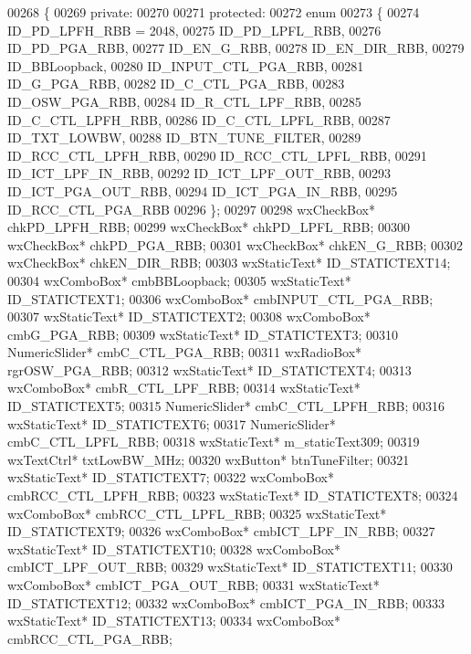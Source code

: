 \begin{DoxyCode}
00268 \{
00269     \textcolor{keyword}{private}:
00270     
00271     \textcolor{keyword}{protected}:
00272         \textcolor{keyword}{enum}
00273         \{
00274             ID\_PD\_LPFH\_RBB = 2048,
00275             ID_PD_LPFL_RBB,
00276             ID_PD_PGA_RBB,
00277             ID_EN_G_RBB,
00278             ID_EN_DIR_RBB,
00279             ID_BBLoopback,
00280             ID_INPUT_CTL_PGA_RBB,
00281             ID_G_PGA_RBB,
00282             ID_C_CTL_PGA_RBB,
00283             ID_OSW_PGA_RBB,
00284             ID_R_CTL_LPF_RBB,
00285             ID_C_CTL_LPFH_RBB,
00286             ID_C_CTL_LPFL_RBB,
00287             ID_TXT_LOWBW,
00288             ID_BTN_TUNE_FILTER,
00289             ID_RCC_CTL_LPFH_RBB,
00290             ID_RCC_CTL_LPFL_RBB,
00291             ID_ICT_LPF_IN_RBB,
00292             ID_ICT_LPF_OUT_RBB,
00293             ID_ICT_PGA_OUT_RBB,
00294             ID_ICT_PGA_IN_RBB,
00295             ID\_RCC\_CTL\_PGA\_RBB
00296         \};
00297         
00298         wxCheckBox* chkPD_LPFH_RBB;
00299         wxCheckBox* chkPD_LPFL_RBB;
00300         wxCheckBox* chkPD_PGA_RBB;
00301         wxCheckBox* chkEN_G_RBB;
00302         wxCheckBox* chkEN_DIR_RBB;
00303         wxStaticText* ID_STATICTEXT14;
00304         wxComboBox* cmbBBLoopback;
00305         wxStaticText* ID_STATICTEXT1;
00306         wxComboBox* cmbINPUT_CTL_PGA_RBB;
00307         wxStaticText* ID_STATICTEXT2;
00308         wxComboBox* cmbG_PGA_RBB;
00309         wxStaticText* ID_STATICTEXT3;
00310         NumericSlider* cmbC_CTL_PGA_RBB;
00311         wxRadioBox* rgrOSW_PGA_RBB;
00312         wxStaticText* ID_STATICTEXT4;
00313         wxComboBox* cmbR_CTL_LPF_RBB;
00314         wxStaticText* ID_STATICTEXT5;
00315         NumericSlider* cmbC_CTL_LPFH_RBB;
00316         wxStaticText* ID_STATICTEXT6;
00317         NumericSlider* cmbC_CTL_LPFL_RBB;
00318         wxStaticText* m_staticText309;
00319         wxTextCtrl* txtLowBW_MHz;
00320         wxButton* btnTuneFilter;
00321         wxStaticText* ID_STATICTEXT7;
00322         wxComboBox* cmbRCC_CTL_LPFH_RBB;
00323         wxStaticText* ID_STATICTEXT8;
00324         wxComboBox* cmbRCC_CTL_LPFL_RBB;
00325         wxStaticText* ID_STATICTEXT9;
00326         wxComboBox* cmbICT_LPF_IN_RBB;
00327         wxStaticText* ID_STATICTEXT10;
00328         wxComboBox* cmbICT_LPF_OUT_RBB;
00329         wxStaticText* ID_STATICTEXT11;
00330         wxComboBox* cmbICT_PGA_OUT_RBB;
00331         wxStaticText* ID_STATICTEXT12;
00332         wxComboBox* cmbICT_PGA_IN_RBB;
00333         wxStaticText* ID_STATICTEXT13;
00334         wxComboBox* cmbRCC_CTL_PGA_RBB;

\end{DoxyCode}
